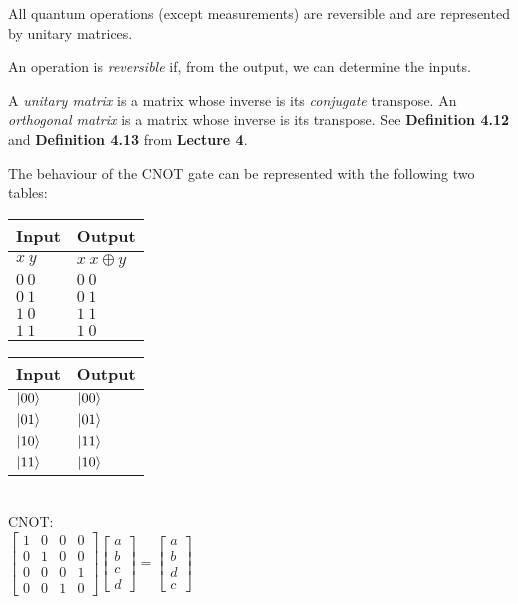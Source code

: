 
All quantum operations (except measurements) are reversible and are represented by unitary matrices.

\begin{definition}
    An operation is \emph{reversible} if, from the output, we can determine the inputs.
\end{definition}

\begin{definition}
    A \emph{unitary matrix} is a matrix whose inverse is its \emph{conjugate} transpose. An \emph{orthogonal matrix} is a matrix whose inverse is its transpose. See \textbf{Definition 4.12} and \textbf{Definition 4.13} from \textbf{Lecture 4}.
\end{definition}

The behaviour of the CNOT gate can be represented with the following two tables:\\
\begin{tabular}{l|l}
    Input & Output\\
    \hline
    $x \ y$ & $x \ x \oplus y$\\
    $0 \ 0$ & $0 \ 0$\\
    $0 \ 1$ & $0 \ 1$\\
    $1 \ 0$ & $1 \ 1$\\
    $1 \ 1$ & $1 \ 0$
\end{tabular}
\begin{tabular}{l|l}
    Input & Output\\
    \hline
    $\lvert00\rangle$ & $\lvert00\rangle$\\
    $\lvert01\rangle$ & $\lvert01\rangle$\\
    $\lvert10\rangle$ & $\lvert11\rangle$\\
    $\lvert11\rangle$ & $\lvert10\rangle$
\end{tabular}\\

CNOT:\\
$\begin{bmatrix}
    1 & 0 & 0 & 0\\
    0 & 1 & 0 & 0\\
    0 & 0 & 0 & 1\\
    0 & 0 & 1 & 0
\end{bmatrix} \begin{bmatrix}
    a\\
    b\\
    c\\
    d
\end{bmatrix} = \begin{bmatrix}
    a\\
    b\\
    d\\
    c
\end{bmatrix}$

